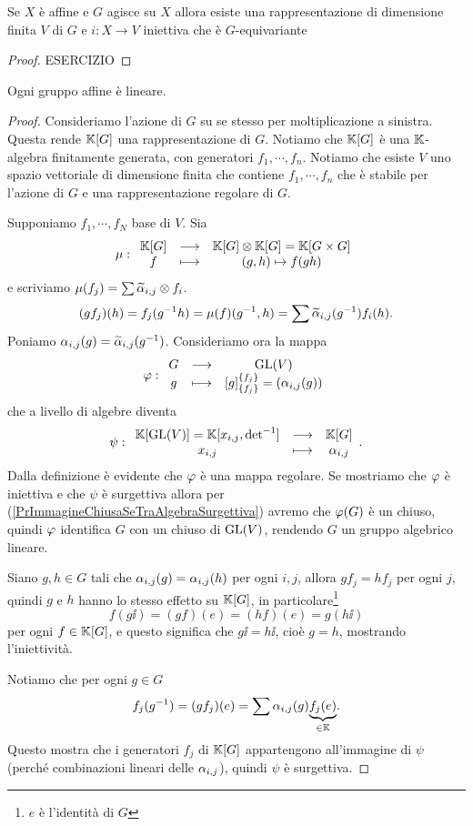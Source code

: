 \begin{theorem}
Se $X$ \`e affine e $G$ agisce su $X$ allora esiste una rappresentazione di dimensione finita $V$ di $G$ e $i:X\to V$ iniettiva che \`e $G$-equivariante
\end{theorem}
\begin{proof}
ESERCIZIO
\end{proof}

\begin{theorem}
Ogni gruppo affine \`e lineare.
\end{theorem}
\begin{proof}
Consideriamo l'azione di $G$ su se stesso per moltiplicazione a sinistra. Questa rende $\mathbb{K}[G]$ una rappresentazione di $G$. Notiamo che $\mathbb{K}[G]$ \`e una $\mathbb{K}$-algebra finitamente generata, con generatori $f_1,\cdots, f_n$. Notiamo che esiste $V$ uno spazio vettoriale di dimensione finita che contiene $f_1,\cdots, f_n$ che \`e stabile per l'azione di $G$ e una rappresentazione regolare di $G$.

Supponiamo $f_1,\cdots, f_N$ base di $V$. Sia
\[\mu:\begin{array}{ccc} {\mathbb{K}[G]} & \longrightarrow & {\mathbb{K}[G]\otimes\mathbb{K}[G]=\mathbb{K}[G\times G]}\\ {f} & \longmapsto & {(g,h)\mapsto f(gh)} \end{array}\]
e scriviamo $\mu(f_j)=\sum \widetilde{\alpha}_{i,j}\otimes f_i$.
\[(g f_j)(h)=f_j(g^{-1} h)=\mu(f)(g^{-1},h)=\sum \widetilde{\alpha}_{i,j}(g^{-1})f_i(h).\]
Poniamo $\alpha_{i,j}(g)=\widetilde{\alpha}_{i,j}(g^{-1})$.
Consideriamo ora la mappa
\[\varphi:\begin{array}{ccc} {G} & \longrightarrow & {\mathrm{GL}(V)}\\ {g} & \longmapsto & {[g]^{\left\{{f_j}\right\}}_{\left\{{f_j}\right\}}=(\alpha_{i,j}(g))} \end{array}\]
che a livello di algebre diventa
\[\psi:\begin{array}{ccc} {\mathbb{K}[\mathrm{GL}(V)]=\mathbb{K}[x_{i,j},\det^{-1}]} & \longrightarrow & {\mathbb{K}[G]}\\ {x_{i,j}} & \longmapsto & {\alpha_{i,j}} \end{array}.\]
Dalla definizione \`e evidente che $\varphi$ \`e una mappa regolare. Se mostriamo che $\varphi$ \`e iniettiva e che $\psi$ \`e surgettiva allora per (\ref{PrImmagineChiusaSeTraAlgebraSurgettiva}) avremo che $\varphi(G)$ \`e un chiuso, quindi $\varphi$ identifica $G$ con un chiuso di $\mathrm{GL}(V)$, rendendo $G$ un gruppo algebrico lineare.

Siano $g, h\in G$ tali che $\alpha_{i,j}(g)=\alpha_{i,j}(h)$ per ogni $i,j$, allora $gf_j=hf_j$ per ogni $j$, quindi $g$ e $h$ hanno lo stesso effetto su $\mathbb{K}[G]$, in particolare\footnote{$e$ \`e l'identit\`a di $G$}
\[f(g\ii)=(gf)(e)=(hf)(e)=g(h\ii)\]
per ogni $f\in\mathbb{K}[G]$, e questo significa che $g\ii=h\ii$, cio\`e $g=h$, mostrando l'iniettivit\`a.

Notiamo che per ogni $g\in G$
\[f_j(g^{-1})=(gf_j)(e)=\sum \alpha_{i,j}(g)\underset{\in\mathbb{K}}{\underbrace{f_j(e)}}.\]
Questo mostra che i generatori $f_j$ di $\mathbb{K}[G]$ appartengono all'immagine di $\psi$ (perch\'e combinazioni lineari delle $\alpha_{i,j}$), quindi $\psi$ \`e surgettiva.
\end{proof}


